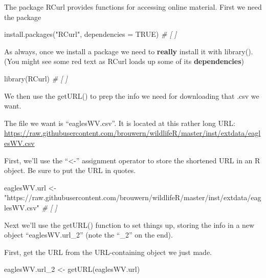 \documentclass[
]{book}
\newenvironment{Shaded}{\begin{snugshade}}{\end{snugshade}}
\newcommand{\AttributeTok}[1]{\textcolor[rgb]{0.77,0.63,0.00}{#1}}
\newcommand{\CommentTok}[1]{\textcolor[rgb]{0.56,0.35,0.01}{\textit{#1}}}
\newcommand{\ConstantTok}[1]{\textcolor[rgb]{0.00,0.00,0.00}{#1}}
\newcommand{\FunctionTok}[1]{\textcolor[rgb]{0.00,0.00,0.00}{#1}}
\newcommand{\NormalTok}[1]{#1}
\newcommand{\OtherTok}[1]{\textcolor[rgb]{0.56,0.35,0.01}{#1}}
\newcommand{\StringTok}[1]{\textcolor[rgb]{0.31,0.60,0.02}{#1}}
\begin{document}
The package RCurl provides functions for accessing online material. First we need the package

\begin{Shaded}
\begin{Highlighting}[]
\FunctionTok{install.packages}\NormalTok{(}\StringTok{"RCurl"}\NormalTok{, }\AttributeTok{dependencies =} \ConstantTok{TRUE}\NormalTok{) }\CommentTok{\# [ ]}
\end{Highlighting}
\end{Shaded}

As always, once we install a package we need to \textbf{really} install it with library(). (You might see some red text as RCurl loads up some of its \textbf{dependencies})

\begin{Shaded}
\begin{Highlighting}[]
\FunctionTok{library}\NormalTok{(RCurl) }\CommentTok{\# [ ]}
\end{Highlighting}
\end{Shaded}

We then use the getURL() to prep the info we need for downloading that .csv we want.

The file we want is ``eaglesWV.csv''. It is located at this rather long URL:\\
\url{https://raw.githubusercontent.com/brouwern/wildlifeR/master/inst/extdata/eaglesWV.csv}

First, we'll use the ``\textless-'' assignment operator to store the shortened URL in an R object. Be sure to put the URL in quotes.

\begin{Shaded}
\begin{Highlighting}[]
\NormalTok{eaglesWV.url }\OtherTok{\textless{}{-}} \StringTok{"https://raw.githubusercontent.com/brouwern/wildlifeR/master/inst/extdata/eaglesWV.csv"} \CommentTok{\# [ ]}
\end{Highlighting}
\end{Shaded}

Next we'll use the getURL() function to set things up, storing the info in a new object ``eaglesWV.url\_2'' (note the ``\_2'' on the end).

First, get the URL from the URL-containing object we just made.

\begin{Shaded}
\begin{Highlighting}[]
\NormalTok{eaglesWV.url\_2 }\OtherTok{\textless{}{-}} \FunctionTok{getURL}\NormalTok{(eaglesWV.url)}
\end{Highlighting}
\end{Shaded}
\end{document}
